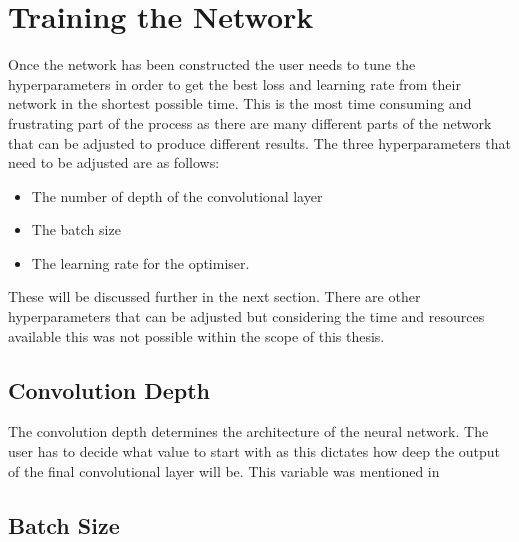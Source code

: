 \section{Training the Network}
Once the network has been constructed the user needs to tune the hyperparameters in order to get the best loss and learning rate from their network in the shortest possible time. This is the most time consuming and frustrating part of the process as there are many different parts of the network that can be adjusted to produce different results. The three hyperparameters that need to be adjusted are as follows:
\begin{itemize}
    \item The number of depth of the convolutional layer
    \item The batch size
    \item The learning rate for the optimiser.
\end{itemize}
These will be discussed further in the next section. There are other hyperparameters that can be adjusted but considering the time and resources available this was not possible within the scope of this thesis.
\subsection{Convolution Depth}
The convolution depth determines the architecture of the neural network. The user has to decide what value to start with as this dictates how deep the output of the final convolutional layer will be. This variable was mentioned in 
\subsection{Batch Size}
